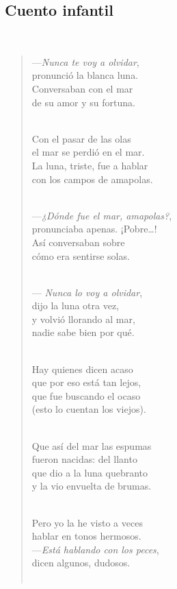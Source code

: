 \documentclass[a4paper, 12pt]{article}
\begin{document}
\pagebreak

\subsection{Cuento infantil}
~ 
\begin{verse}
    
—\textit{Nunca te voy a olvidar},\\
pronunció la blanca luna.\\
Conversaban con el mar\\
de su amor y su fortuna.\\
~ 

Con el pasar de las olas\\
el mar se perdió en el mar.\\
La luna, triste, fue a hablar\\
con los campos de amapolas.\\
~ 

—\textit{¿Dónde fue el mar, amapolas?},\\
pronunciaba apenas. ¡Pobre…!\\
Así conversaban sobre\\
cómo era sentirse solas.\\
~ 

— \textit{Nunca lo voy a olvidar},\\
dijo la luna otra vez,\\
y volvió llorando al mar,\\
nadie sabe bien por qué.\\
~ 

Hay quienes dicen acaso\\
que por eso está tan lejos,\\
que fue buscando el ocaso\\
(esto lo cuentan los viejos).\\
~ 

Que así del mar las espumas\\
fueron nacidas: del llanto\\
que dio a la luna quebranto\\
y la vio envuelta de brumas.\\
~ 

Pero yo la he visto a veces\\
hablar en tonos hermosos.\\
—\textit{Está hablando con los peces},\\
 dicen algunos, dudosos.\\
 ~ 


\end{verse}
\end{document}
